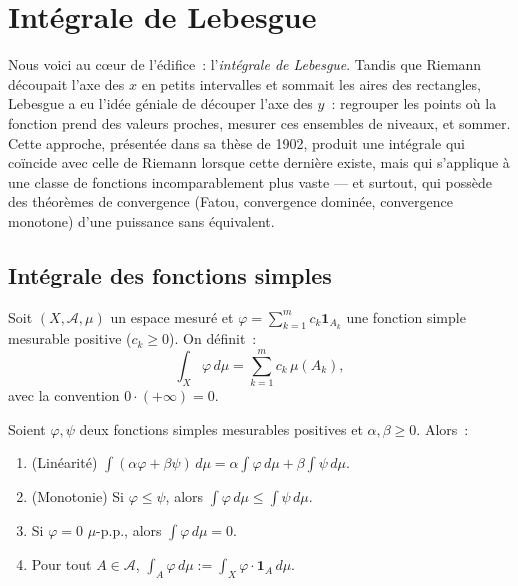 \chapter{Int\'egrale de Lebesgue}
\label{ch:integrale}

Nous voici au c\oe ur de l'\'edifice~: l'\emph{int\'egrale de Lebesgue}. Tandis que Riemann d\'ecoupait l'axe des $x$ en petits intervalles et sommait les aires des rectangles, Lebesgue a eu l'id\'ee g\'eniale de d\'ecouper l'axe des $y$~: regrouper les points o\`u la fonction prend des valeurs proches, mesurer ces ensembles de niveaux, et sommer. Cette approche, pr\'esent\'ee dans sa th\`ese de 1902, produit une int\'egrale qui co\"incide avec celle de Riemann lorsque cette derni\`ere existe, mais qui s'applique \`a une classe de fonctions incomparablement plus vaste --- et surtout, qui poss\`ede des th\'eor\`emes de convergence (Fatou, convergence domin\'ee, convergence monotone) d'une puissance sans \'equivalent.

\section{Int\'egrale des fonctions simples}

\begin{definition}
Soit $(X, \mathcal{A}, \mu)$ un espace mesur\'e et $\varphi = \sum_{k=1}^m c_k
\mathbf{1}_{A_k}$ une fonction simple mesurable positive ($c_k \geq 0$). On d\'efinit~:
\[
\int_X \varphi\, d\mu = \sum_{k=1}^m c_k\, \mu(A_k),
\]
avec la convention $0 \cdot (+\infty) = 0$.
\end{definition}

\begin{proposition}
\label{prop:integrale_simples}
Soient $\varphi, \psi$ deux fonctions simples mesurables positives et
$\alpha, \beta \geq 0$. Alors~:
\begin{enumerate}
    \item (Lin\'earit\'e) $\int (\alpha\varphi + \beta\psi)\, d\mu =
    \alpha \int \varphi\, d\mu + \beta \int \psi\, d\mu$.
    \item (Monotonie) Si $\varphi \leq \psi$, alors
    $\int \varphi\, d\mu \leq \int \psi\, d\mu$.
    \item Si $\varphi = 0$ $\mu$-p.p., alors $\int \varphi\, d\mu = 0$.
    \item Pour tout $A \in \mathcal{A}$,
    $\int_A \varphi\, d\mu := \int_X \varphi \cdot \mathbf{1}_A\, d\mu$.
\end{enumerate}
\end{proposition}

